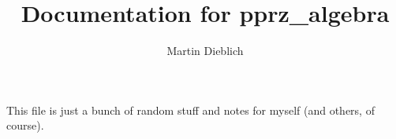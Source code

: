 \documentclass[10pt,a4paper]{paper}
\title{Documentation for pprz_algebra}
\author{Martin Dieblich}
\begin{document}
This file is just a bunch of random stuff and notes for myself (and others, of course).

%
\end{document}
